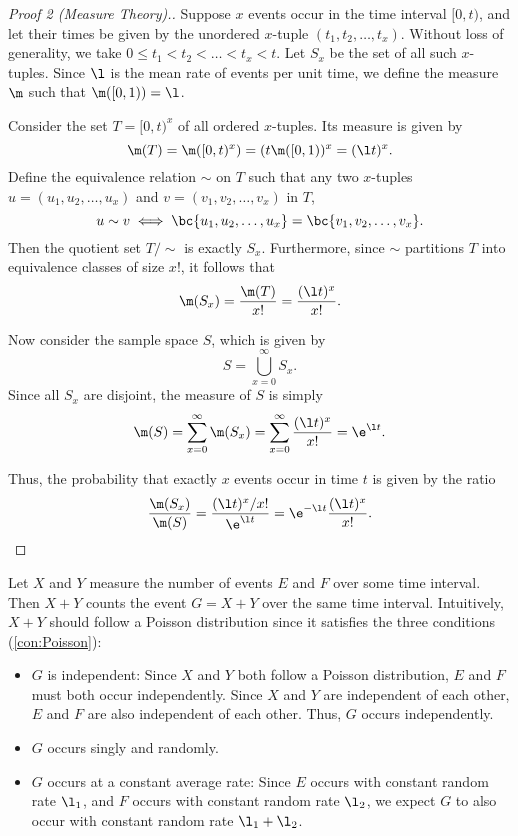 \begin{proof}[Proof 2 (Measure Theory).]
    Suppose $x$ events occur in the time interval $[0, t)$, and let their times be given by the unordered $x$-tuple $(t_1, t_2, \dots, t_x)$. Without loss of generality, we take $0 \leq t_1 < t_2 < \dots < t_x < t$. Let $S_x$ be the set of all such $x$-tuples. Since $\l$ is the mean rate of events per unit time, we define the measure $\m$ such that $\m([0, 1)) = \l$.

    Consider the set $T = [0, t)^x$ of all ordered $x$-tuples. Its measure is given by \[\m(T) = \m([0, t)^x) = (t \m([0, 1))^x = (\l t)^x.\] Define the equivalence relation $\sim$ on $T$ such that any two $x$-tuples $u = (u_1, u_2, \dots, u_x)$ and $v = (v_1, v_2, \dots, v_x)$ in $T$, \[u \sim v \iff \bc{u_1, u_2, \dots, u_x} = \bc{v_1, v_2, \dots, v_x}.\] Then the quotient set $T / \sim$ is exactly $S_x$. Furthermore, since $\sim$ partitions $T$ into equivalence classes of size $x!$, it follows that \[\m(S_x) = \frac{\m(T)}{x!} = \frac{(\l t)^x}{x!}.\]
    
    Now consider the sample space $S$, which is given by \[S = \bigcup_{x = 0}^\infty S_x.\] Since all $S_x$ are disjoint, the measure of $S$ is simply \[\m(S) = \sum_{x = 0}^\infty \m(S_x) = \sum_{x = 0}^\infty \frac{(\l t)^x}{x!} = \e^{\l t}.\]

    Thus, the probability that exactly $x$ events occur in time $t$ is given by the ratio \[\frac{\m(S_x)}{\m(S)} = \frac{(\l t)^x / x!}{\e^{\l t}} = \e^{-\l t} \frac{(\l t)^x}{x!}.\]
\end{proof}

Let $X$ and $Y$ measure the number of events $E$ and $F$ over some time interval. Then $X + Y$ counts the event $G = X + Y$ over the same time interval. Intuitively, $X + Y$ should follow a Poisson distribution since it satisfies the three conditions (\ref{con:Poisson}):

\begin{itemize}
    \item $G$ is independent: Since $X$ and $Y$ both follow a Poisson distribution, $E$ and $F$ must both occur independently. Since $X$ and $Y$ are independent of each other, $E$ and $F$ are also independent of each other. Thus, $G$ occurs independently.
    \item $G$ occurs singly and randomly.
    \item $G$ occurs at a constant average rate: Since $E$ occurs with constant random rate $\l_1$, and $F$ occurs with constant random rate $\l_2$, we expect $G$ to also occur with constant random rate $\l_1 + \l_2$.
\end{itemize}

